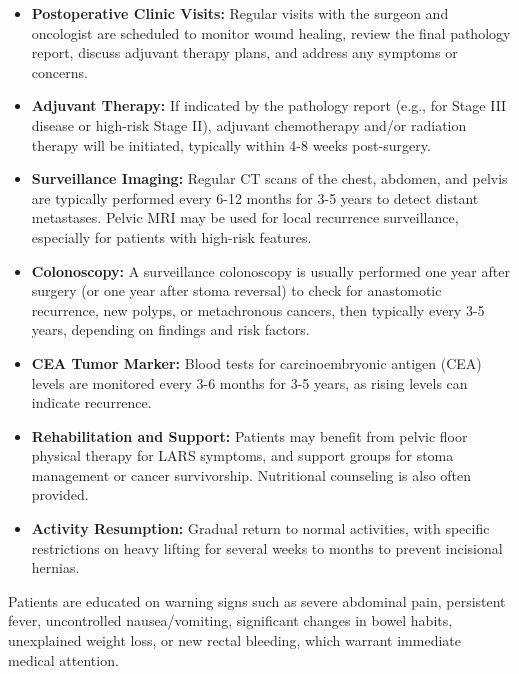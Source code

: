 \begin{itemize}
  \item \textbf{Postoperative Clinic Visits:} Regular visits with the surgeon and oncologist are scheduled to monitor wound healing, review the final pathology report, discuss adjuvant therapy plans, and address any symptoms or concerns.
  
  \item \textbf{Adjuvant Therapy:} If indicated by the pathology report (e.g., for Stage III disease or high-risk Stage II), adjuvant chemotherapy and/or radiation therapy will be initiated, typically within 4-8 weeks post-surgery.
  
  \item \textbf{Surveillance Imaging:} Regular CT scans of the chest, abdomen, and pelvis are typically performed every 6-12 months for 3-5 years to detect distant metastases. Pelvic MRI may be used for local recurrence surveillance, especially for patients with high-risk features.
  
  \item \textbf{Colonoscopy:} A surveillance colonoscopy is usually performed one year after surgery (or one year after stoma reversal) to check for anastomotic recurrence, new polyps, or metachronous cancers, then typically every 3-5 years, depending on findings and risk factors.
  
  \item \textbf{CEA Tumor Marker:} Blood tests for carcinoembryonic antigen (CEA) levels are monitored every 3-6 months for 3-5 years, as rising levels can indicate recurrence.
  
  \item \textbf{Rehabilitation and Support:} Patients may benefit from pelvic floor physical therapy for LARS symptoms, and support groups for stoma management or cancer survivorship. Nutritional counseling is also often provided.
  
  \item \textbf{Activity Resumption:} Gradual return to normal activities, with specific restrictions on heavy lifting for several weeks to months to prevent incisional hernias.
\end{itemize}

Patients are educated on warning signs such as severe abdominal pain, persistent fever, uncontrolled nausea/vomiting, significant changes in bowel habits, unexplained weight loss, or new rectal bleeding, which warrant immediate medical attention.

